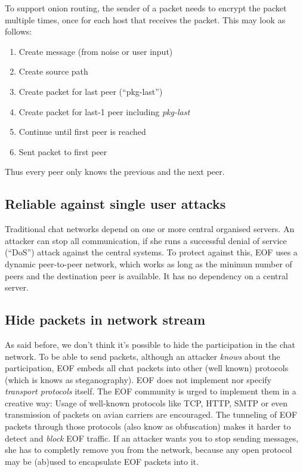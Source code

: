 \documentclass[12pt,a4paper]{book}
\begin{document}
To support onion routing, the sender of a packet needs to encrypt the packet
multiple times, once for each host that receives the packet. This may look
as follows:
\begin{enumerate}
\item Create message (from noise or user input)
\item Create source path
\item Create packet for last peer ("`pkg-last"')
\item Create packet for last-1 peer including \emph{pkg-last}
\item Continue until first peer is reached
\item Sent packet to first peer
\end{enumerate}
Thus every peer only knows the previous and the next peer.
\subsection{Reliable against single user attacks}
Traditional chat networks depend on one or more central organised servers.
An attacker can stop all communication, if she runs a successful denial
of service ("`DoS"') attack against the central systems.
To protect against this, EOF uses a dynamic peer-to-peer network, which works
as long as the minimun number of peers and the destination peer is available.
It has no dependency on a central server.
\subsection{Hide packets in network stream}
As said before, we don't think it's possible to hide the participation in the
chat network. To be able to send packets, although an attacker \emph{knows}
about the participation, EOF embeds all chat packets into other (well known)
protocols (which is knows as steganography\cite{stegano-1}).
EOF does not implement nor specify \emph{transport protocols} itself.
The EOF community is urged to implement them in a creative way: Usage
of well-known protocols like TCP\cite{tcp-1}, HTTP\cite{http-1},
SMTP\cite{smtp-1} or even transmission of packets on avian
carriers\cite{avian-1} are encouraged. The tunneling of EOF packets through
those protocols (also know as obfuscation) makes it harder to detect
and \emph{block} EOF traffic.
If an attacker wants you to stop sending messages, she has to completly
remove you from the network, because any open protocol may be (ab)used to
encapsulate EOF packets into it.
\end{document}
